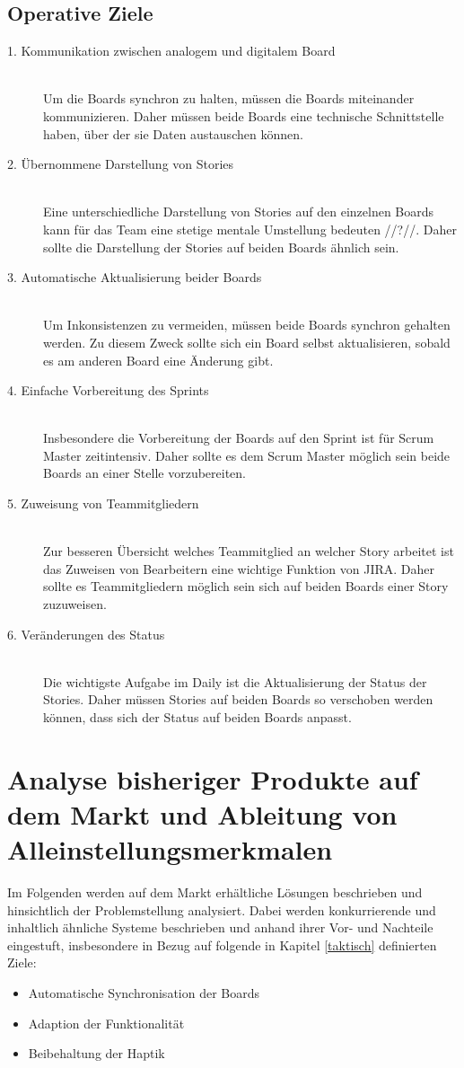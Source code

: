 \documentclass[12pt,titlepage]{scrartcl}
\begin{document}
		\subsection{Operative Ziele} \label{operativeZiele}
		\begin{description}
 			\item[1. Kommunikation zwischen analogem und digitalem Board] \hfill \\
 			Um die Boards synchron zu halten, müssen die Boards miteinander kommunizieren. Daher müssen beide Boards eine technische Schnittstelle haben, über der sie Daten austauschen können. 
 			\item[2. Übernommene Darstellung von Stories] \hfill \\
 			Eine unterschiedliche Darstellung von Stories auf den einzelnen Boards kann für das Team eine stetige mentale Umstellung bedeuten //?//. Daher sollte die Darstellung der Stories auf beiden Boards ähnlich sein.
 			\item[3. Automatische Aktualisierung beider Boards] \hfill \\
 			Um Inkonsistenzen zu vermeiden, müssen beide Boards synchron gehalten werden. Zu diesem Zweck sollte sich ein Board selbst aktualisieren, sobald es am anderen Board eine Änderung gibt.
 			\item[4. Einfache Vorbereitung des Sprints] \hfill \\
 			Insbesondere die Vorbereitung der Boards auf den Sprint ist für Scrum Master zeitintensiv. Daher sollte es dem Scrum Master möglich sein beide Boards an einer Stelle vorzubereiten.
 			\item[5. Zuweisung von Teammitgliedern] \hfill \\
 			Zur besseren Übersicht welches Teammitglied an welcher Story arbeitet ist das Zuweisen von Bearbeitern eine wichtige Funktion von JIRA. Daher sollte es Teammitgliedern möglich sein sich auf beiden Boards einer Story zuzuweisen.
 			\item[6. Veränderungen des Status] \hfill \\
 			Die wichtigste Aufgabe im Daily ist die Aktualisierung der Status der Stories. Daher müssen Stories auf beiden Boards so verschoben werden können, dass sich der Status auf beiden Boards anpasst.
		\end{description}
	\newpage	
	\section{Analyse bisheriger Produkte auf dem Markt und Ableitung von Alleinstellungsmerkmalen}
	Im Folgenden werden auf dem Markt erhältliche Lösungen beschrieben und hinsichtlich der Problemstellung analysiert. Dabei werden konkurrierende und inhaltlich ähnliche Systeme beschrieben und anhand ihrer Vor- und Nachteile eingestuft, insbesondere in Bezug auf folgende in Kapitel \ref{taktisch} definierten Ziele:
	\begin{itemize} 
		\item Automatische Synchronisation der Boards 
		\item Adaption der Funktionalität
		\item Beibehaltung der Haptik 
	\end{itemize}
\end{document}
